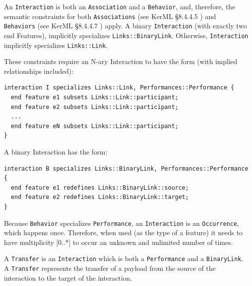 

\pn An \texttt{Interaction} is both an \texttt{Association} and a \texttt{Behavior}, and, therefore, the semantic constraints for both \texttt{Associations} (see KerML \S8.4.4.5 ) and \texttt{Behaviors} (see KerML \S8.4.4.7 ) apply.  A binary \texttt{Interaction} (with exactly two end Features), implicitly specializes \texttt{Links::BinaryLink}.  Otherwise, \texttt{Interaction} implicitly specializes \texttt{Links::Link}.

\pn These constraints require an N-ary Interaction to have the form (with implied relationships included):

\begin{lstlisting}
interaction I specializes Links::Link, Performances::Performance {
  end feature e1 subsets Links::Link::participant;
  end feature e2 subsets Links::Link::participant;
  ...
  end feature eN subsets Links::Link::participant; 
}
\end{lstlisting}

A binary Interaction has the form:
\begin{lstlisting}
interaction B specializes Links::BinaryLink, Performances::Performance { 
  end feature e1 redefines Links::BinaryLink::source;
  end feature e2 redefines Links::BinaryLink::target;
}
\end{lstlisting}

\pn Because \texttt{Behavior} specializes \texttt{Performance}, an  \texttt{Interaction} is an \texttt{Occurrence}, which happens once.
Therefore, when used (as the type of a feature) it needs to have multiplicity [0..*] to occur an unknown and unlimited number of times.

\pn A \texttt{Transfer} is an \texttt{Interaction} which is both a \texttt{Performance} and a \texttt{BinaryLink}.  A \texttt{Transfer} represents the transfer of a payload from the source of the interaction to the target of the interaction.

